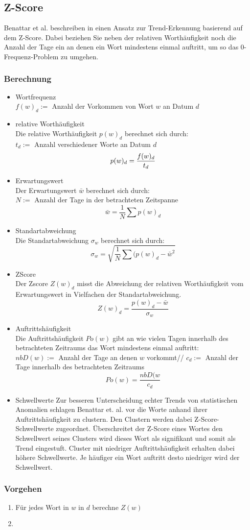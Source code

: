 \subsection{Z-Score}
Benattar et al. beschreiben in \cite{benattar2011trend} einen Ansatz zur Trend-Erkennung basierend auf dem Z-Score. Dabei beziehen Sie neben der relativen Worthäufigkeit noch die Anzahl der Tage ein an denen ein Wort mindestens einmal auftritt, um so das 0-Frequenz-Problem zu umgehen.

\subsubsection{Berechnung}
\begin{itemize}
	\item{Wortfrequenz}\\
		$f(w)_d :=$ Anzahl der Vorkommen von Wort $w$ an Datum $d$
	\item{relative Worthäufigkeit}\\
		Die relative Worthäufigkeit $p(w)_d$ berechnet sich durch: \\
		$t_d :=$ Anzahl verschiedener Worte an Datum $d$
		$$ p(w)_d = \frac{f(w)_d}{t_d} \\ $$
	\item{Erwartungswert}\\
		Der Erwartungswert $\bar{w}$ berechnet sich durch: \\
		$N:=$ Anzahl der Tage in der betrachteten Zeitspanne
		$$\bar{w}=\frac{1}{N} \sum p(w)_d$$
	\item{Standartabweichung}\\
		Die Standartabweichung $\sigma_w$ berechnet sich durch:
		$$\sigma_w = \sqrt{\frac{1}{N} \sum (p(w)_d - \bar{w}^2}$$
	\item{ZScore}\\
		Der Zscore $Z(w)_d$ misst die Abweichung der relativen Worthäufigkeit vom Erwartungswert in Vielfachen der Standartabweichung.
		$$Z(w)_d= \frac{p(w)_d - \bar{w}}{\sigma_w}$$		
	\item{Auftrittshäufigkeit}\\
		Die Auftrittshäufigkeit $Po(w)$ gibt an wie vielen Tagen innerhalb des betrachteten Zeitraums das Wort mindestens einmal auftritt:\\
		$nbD(w) :=$ Anzahl der Tage an denen $w$ vorkommt//
		$c_d:=$ Anzahl der Tage innerhalb des betrachteten Zeitraums
		$$Po(w)=\frac{nbD(w}{c_d}$$
	\item{Schwellwerte}
		Zur besseren Unterscheidung echter Trends von statistischen Anomalien schlagen Benattar et. al. vor die Worte anhand ihrer Auftrittshäufigkeit zu clustern. Den Clustern werden dabei Z-Score-Schwellwerte zugeordnet. Überschreitet der Z-Score eines Wortes den Schwellwert seines Clusters wird dieses Wort als signifikant und somit als Trend eingestuft. Cluster mit niedriger Auftrittshäufigkeit erhalten dabei höhere Schwellwerte. Je häufiger ein Wort auftritt desto niedriger wird der Schwellwert. 
		
		
\end{itemize}

\subsubsection{Vorgehen}
\begin{enumerate}
	\item Für jedes Wort in $w$ in $d$ berechne $Z(w)$
	\item 
\end{enumerate}
